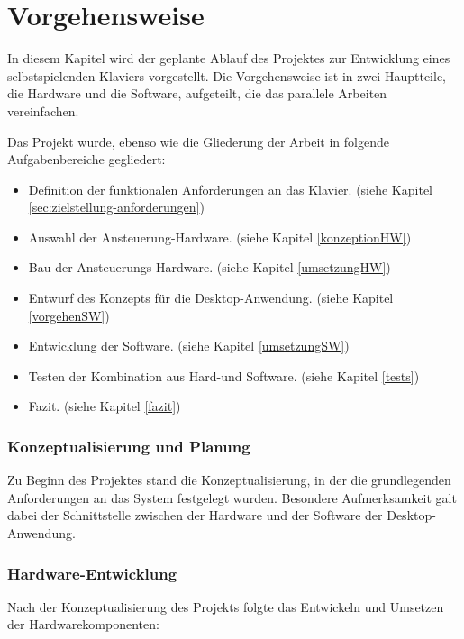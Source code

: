 \section{Vorgehensweise} \label{sec:zielstellung-vorgehen}

In diesem Kapitel wird der geplante Ablauf des Projektes zur Entwicklung eines selbstspielenden Klaviers vorgestellt.
Die Vorgehensweise ist in zwei Hauptteile, die Hardware und die Software, aufgeteilt, die das parallele Arbeiten vereinfachen.

Das Projekt wurde, ebenso wie die Gliederung der Arbeit in folgende Aufgabenbereiche gegliedert:

\begin{itemize}
    \item Definition der funktionalen Anforderungen an das Klavier. (siehe Kapitel \ref{sec:zielstellung-anforderungen})
    \item Auswahl der Ansteuerung-Hardware. (siehe Kapitel \ref{konzeptionHW})
    \item Bau der Ansteuerungs-Hardware. (siehe Kapitel \ref{umsetzungHW})
    \item Entwurf des Konzepts für die Desktop-Anwendung. (siehe Kapitel \ref{vorgehenSW})
    \item Entwicklung der Software. (siehe Kapitel \ref{umsetzungSW})
    \item Testen der Kombination aus Hard-und Software. (siehe Kapitel \ref{tests})
    \item Fazit. (siehe Kapitel \ref{fazit})
\end{itemize}


\subsubsection{Konzeptualisierung und Planung}\label{Vorgehensweise - Konzeptualisierung und Planung}

Zu Beginn des Projektes stand die Konzeptualisierung, in der die grundlegenden Anforderungen an das System festgelegt wurden.
Besondere Aufmerksamkeit galt dabei der Schnittstelle zwischen der Hardware und der Software der Desktop-Anwendung.

\subsubsection{Hardware-Entwicklung}\label{Vorgehensweise - Hardware-Implementierung}

Nach der Konzeptualisierung des Projekts folgte das Entwickeln und Umsetzen der Hardwarekomponenten:


